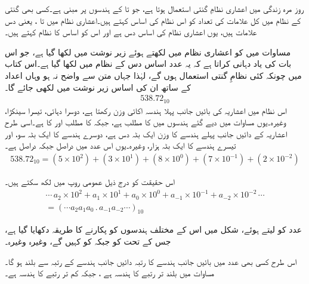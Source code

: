 

روز مرہ  زندگی میں اعشاری نظامِ گنتی  استعمال ہوتا ہے،  جو   تا   کے ہندسوں پر مبنی ہے۔کسی بھی گنتی کے نظام میں کل علامات کی تعداد کو اس نظام کی  اساس  کہتے ہیں۔اعشاری نظام   میں  تا ،  یعنی دس  علامات ہیں، یوں اعشاری نظام کی  اساس دس ہے اور اس  کو اساس   کا نظام کہتے ہیں۔

	مساوات   میں    کو  اعشاری نظام میں لکھتے ہوئے زیر نوشت  میں    لکھا گیا ہے، جو  اس بات کی یاد دہانی کراتا ہے کہ یہ عدد  اساس دس کے نظام میں لکھا گیا ہے۔اس کتاب میں چونکہ کئی نظامِ گنتی استعمال ہوں گے،  لہٰذا جہاں متن سے واضح نہ ہو وہاں اعداد کے ساتھ ان کی  اساس زیر نوشت میں لکھی  جائے گا۔
\begin{align}\label{مساوات_ثنائی_عدد}
538.72_{10}
\end{align}
اس نظام میں اعشاریہ کی بائیں جانب پہلا ہندسہ اکائی وزن رکھتا ہے، دوسرا دہائی، تیسرا سینکڑا،  وغیرہ۔یوں مساوات    میں  دیے گئے ہندسوں میں     کا 
مطلب     ہے،  جبکہ       کا مطلب      اور     کا      ہے۔اسی طرح اعشاریہ کے دائیں جانب پہلے  ہندسے   کا وزن ایک بٹہ دس ہے، دوسرے  ہندسے  کا ایک بٹہ سو،  اور تیسرے ہندسے کا ایک بٹہ ہزار،  وغیرہ۔یوں  اس عدد میں    دراصل    جبکہ    دراصل    ہے۔
\begin{align}\label{مساوات_ثنائی_سینکڑا}
538.72_{10}=(5\times 10^2)+(3\times 10^1)+(8\times 10^0)+(7\times 10^{-1})+(2\times 10^{-2})
\end{align}

اس حقیقت  کو درج ذیل  عمومی روپ  میں   لکھ سکتے ہیں۔
\begin{multline}\label{مساوات_ثنائی_عمومی_روپ}
\cdots \,a_2\times 10^2+a_1\times 10^1+a_0\times 10^0+a_{-1}\times 10^{-1}+a_{-2}\times 10^{-2}\, \cdots\\
=(\cdots a_2a_1a_0\, .\, a_{-1}a_{-2}\cdots)_{10}
\end{multline}

	 عدد   کو    لیتے   ہوئے، شکل     میں اس  کے مختلف ہندسوں کو پکارنے  کا طریقہ دکھایا گیا ہے،   جس کے تحت   کو   جبکہ    کو  کہیں گے، وغیرہ وغیرہ۔

	اس طرح کسی بھی عدد میں بائیں جانب  ہندسے کا رتبہ  دائیں جانب  ہندسے  کے رتبہ سے بلند ہو گا۔مساوات   میں بلند تر رتبے  کا  ہندسہ  ہے ، جبکہ کم تر رتبے کا   ہندسہ ہے۔
	
